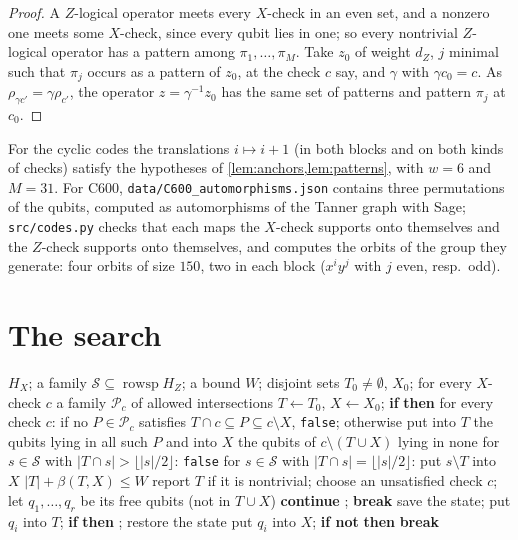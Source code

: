 \documentclass[11pt]{amsart}
\theoremstyle{definition}
\theoremstyle{remark}
\newcommand{\rowsp}{\operatorname{rowsp}}
\begin{document}
\begin{proof}
A $Z$-logical operator meets every $X$-check in an even set, and a nonzero one meets some $X$-check, since every qubit lies in one; so every nontrivial $Z$-logical operator has a pattern among $\pi_1,\dots,\pi_M$. Take $z_0$ of weight $d_Z$, $j$ minimal such that $\pi_j$ occurs as a pattern of $z_0$, at the check $c$ say, and $\gamma$ with $\gamma c_0=c$. As $\rho_{\gamma c'}=\gamma\rho_{c'}$, the operator $z=\gamma^{-1}z_0$ has the same set of patterns and pattern $\pi_j$ at $c_0$.
\end{proof}

For the cyclic codes the translations $i\mapsto i+1$ (in both blocks and on both kinds of checks) satisfy the hypotheses of \cref{lem:anchors,lem:patterns}, with $w=6$ and $M=31$. For C600, \texttt{data/C600\_automorphisms.json} contains three permutations of the qubits, computed as automorphisms of the Tanner graph with Sage; \texttt{src/codes.py} checks that each maps the $X$-check supports onto themselves and the $Z$-check supports onto themselves, and computes the orbits of the group they generate: four orbits of size $150$, two in each block ($x^iy^j$ with $j$ even, resp.\ odd).

\section{The search}\label{sec:search}

\begin{algorithm}
\caption{Anchored search with exclusions}\label{alg:search}
\begin{algorithmic}[1]
\Require $H_X$; a family $\mathcal S\subseteq\rowsp H_Z$; a bound $W$; disjoint sets $T_0\ne\emptyset$, $X_0$; for every $X$-check $c$ a family $\mathcal P_c$ of allowed intersections
\State $T\gets T_0$, $X\gets X_0$; \textbf{if}  \textbf{then} 
  \Repeat
    \State for every check $c$: if no $P\in\mathcal P_c$ satisfies $T\cap c\subseteq P\subseteq c\setminus X$, \Return \texttt{false}; otherwise put into $T$ the qubits lying in all such $P$ and into $X$ the qubits of $c\setminus(T\cup X)$ lying in none
    \State for $s\in\mathcal S$ with $|T\cap s|>\lfloor|s|/2\rfloor$: \Return \texttt{false}
    \State for $s\in\mathcal S$ with $|T\cap s|=\lfloor|s|/2\rfloor$: put $s\setminus T$ into $X$
  \State \Return $|T|+\beta(T,X)\le W$
\EndProcedure
{}
   report $T$ if it is nontrivial; \Return \EndIf
  \State choose an unsatisfied check $c$; let $q_1,\dots,q_r$ be its free qubits (not in $T\cup X$)
     \textbf{continue} \EndIf
     ; \textbf{break} \EndIf
    \State save the state; put $q_i$ into $T$; \textbf{if}  \textbf{then} ; restore the state
    \State put $q_i$ into $X$; \textbf{if not}  \textbf{then} \textbf{break}
  \EndFor
\EndProcedure
\end{algorithmic}
\end{algorithm}
\end{document}
